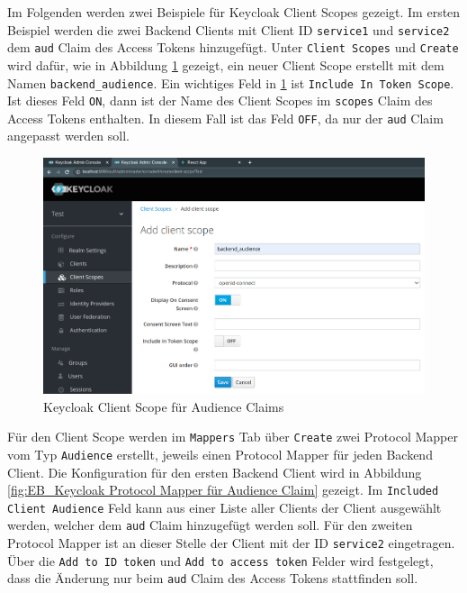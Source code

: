 Im Folgenden werden zwei Beispiele für Keycloak Client Scopes gezeigt. Im ersten Beispiel werden die zwei Backend Clients mit Client ID \texttt{service1} und \texttt{service2} dem \texttt{aud} Claim des Access Tokens hinzugefügt. Unter \texttt{Client Scopes} und \texttt{Create} wird dafür, wie in Abbildung \ref{fig:EB_Keycloak Client Scope für Audience Claim} gezeigt, ein neuer Client Scope erstellt mit dem Namen \texttt{backend\_audience}. Ein wichtiges Feld in \ref{fig:EB_Keycloak Client Scope für Audience Claim} ist \texttt{Include In Token Scope}. Ist dieses Feld \texttt{ON}, dann ist der Name des Client Scopes im \texttt{scopes} Claim des Access Tokens enthalten. In diesem Fall ist das Feld \texttt{OFF}, da nur der \texttt{aud} Claim angepasst werden soll.

\begin{figure}[!ht]
	\centering
	\includegraphics[width=1\textwidth]{Images/Ebert/KeycloakNewAudClientScope.PNG}
	\caption{Keycloak Client Scope für Audience Claims}
	\label{fig:EB_Keycloak Client Scope für Audience Claim}
\end{figure}

Für den Client Scope werden im \texttt{Mappers} Tab über \texttt{Create} zwei Protocol Mapper vom Typ \texttt{Audience} erstellt, jeweils einen Protocol Mapper für jeden Backend Client. Die Konfiguration für den ersten Backend Client wird in Abbildung \ref{fig:EB_Keycloak Protocol Mapper für Audience Claim} gezeigt. Im \texttt{Included Client Audience} Feld kann aus einer Liste aller Clients der Client ausgewählt werden, welcher dem \texttt{aud} Claim hinzugefügt werden soll. Für den zweiten Protocol Mapper ist an dieser Stelle der Client mit der ID \texttt{service2} eingetragen. Über die \texttt{Add to ID token} und \texttt{Add to access token} Felder wird festgelegt, dass die Änderung nur beim \texttt{aud} Claim des Access Tokens stattfinden soll.

